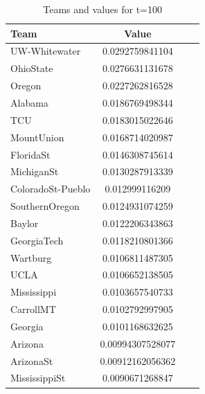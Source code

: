 \documentclass[11pt]{article}
\begin{document}
\begin{table}[!th]
\centering
\begin{tabular}{|l|c|cl}
\hline
Team & Value \\
\hline
UW-Whitewater & 0.0292759841104 \\
OhioState & 0.0276631131678 \\
Oregon & 0.0227262816528 \\
Alabama & 0.0186769498344 \\
TCU & 0.0183015022646 \\
MountUnion & 0.0168714020987 \\
FloridaSt & 0.0146308745614 \\
MichiganSt & 0.0130287913339 \\
ColoradoSt-Pueblo & 0.012999116209 \\
SouthernOregon & 0.0124931074259 \\
Baylor & 0.0122206343863 \\
GeorgiaTech & 0.0118210801366 \\
Wartburg & 0.0106811487305 \\
UCLA & 0.0106652138505 \\
Mississippi & 0.0103657540733 \\
CarrollMT & 0.0102792997905 \\
Georgia & 0.0101168632625 \\
Arizona & 0.00994307528077 \\
ArizonaSt & 0.00912162056362 \\
MississippiSt & 0.0090671268847 \\
\hline
\end{tabular}
\caption{Teams and values for t=100}
\label{ex:table}
\end{table}
\end{document}
